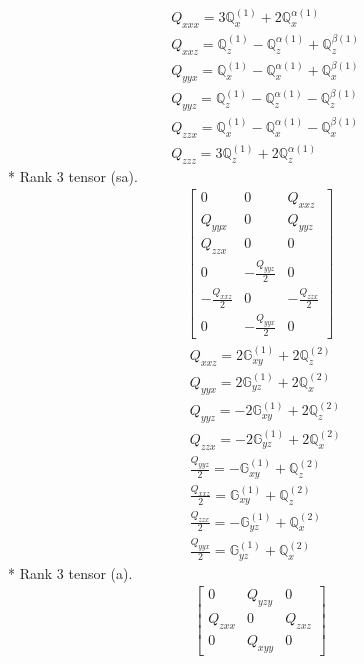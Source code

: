\documentclass[fleqn,8pt,landscape]{jsarticle}
\begin{document}
\begin{align*}
& Q_{xxx} = 3 \mathbb{Q}_{x}^{(1)} + 2 \mathbb{Q}_{x}^{\alpha(1)} \\
& Q_{xxz} = \mathbb{Q}_{z}^{(1)} - \mathbb{Q}_{z}^{\alpha(1)} + \mathbb{Q}_{z}^{\beta(1)} \\
& Q_{yyx} = \mathbb{Q}_{x}^{(1)} - \mathbb{Q}_{x}^{\alpha(1)} + \mathbb{Q}_{x}^{\beta(1)} \\
& Q_{yyz} = \mathbb{Q}_{z}^{(1)} - \mathbb{Q}_{z}^{\alpha(1)} - \mathbb{Q}_{z}^{\beta(1)} \\
& Q_{zzx} = \mathbb{Q}_{x}^{(1)} - \mathbb{Q}_{x}^{\alpha(1)} - \mathbb{Q}_{x}^{\beta(1)} \\
& Q_{zzz} = 3 \mathbb{Q}_{z}^{(1)} + 2 \mathbb{Q}_{z}^{\alpha(1)}
\end{align*}
* Rank 3 tensor (sa).
\begin{align*}
\begin{bmatrix} 0 & 0 & Q_{xxz} \\ Q_{yyx} & 0 & Q_{yyz} \\ Q_{zzx} & 0 & 0 \\ 0 & - \frac{Q_{yyz}}{2} & 0 \\ - \frac{Q_{xxz}}{2} & 0 & - \frac{Q_{zzx}}{2} \\ 0 & - \frac{Q_{yyx}}{2} & 0 \end{bmatrix}
\end{align*}
\begin{align*}
& Q_{xxz} = 2 \mathbb{G}_{xy}^{(1)} + 2 \mathbb{Q}_{z}^{(2)} \\
& Q_{yyx} = 2 \mathbb{G}_{yz}^{(1)} + 2 \mathbb{Q}_{x}^{(2)} \\
& Q_{yyz} = - 2 \mathbb{G}_{xy}^{(1)} + 2 \mathbb{Q}_{z}^{(2)} \\
& Q_{zzx} = - 2 \mathbb{G}_{yz}^{(1)} + 2 \mathbb{Q}_{x}^{(2)} \\
& \frac{Q_{yyz}}{2} = - \mathbb{G}_{xy}^{(1)} + \mathbb{Q}_{z}^{(2)} \\
& \frac{Q_{xxz}}{2} = \mathbb{G}_{xy}^{(1)} + \mathbb{Q}_{z}^{(2)} \\
& \frac{Q_{zzx}}{2} = - \mathbb{G}_{yz}^{(1)} + \mathbb{Q}_{x}^{(2)} \\
& \frac{Q_{yyx}}{2} = \mathbb{G}_{yz}^{(1)} + \mathbb{Q}_{x}^{(2)}
\end{align*}
* Rank 3 tensor (a).
\begin{align*}
\begin{bmatrix} 0 & Q_{yzy} & 0 \\ Q_{zxx} & 0 & Q_{zxz} \\ 0 & Q_{xyy} & 0 \end{bmatrix}
\end{align*}
\end{document}
